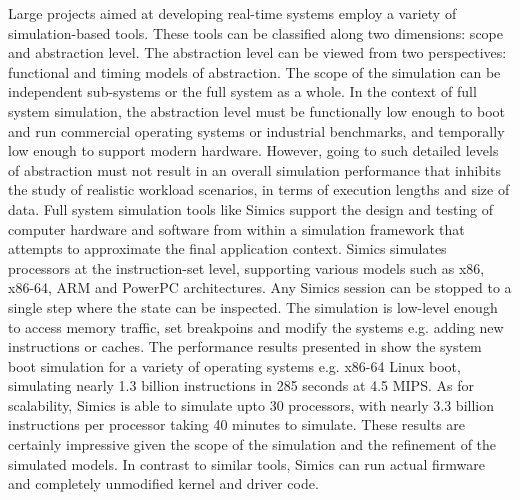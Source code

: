 Large projects aimed at developing real-time systems employ a variety of
simulation-based tools. These tools can be classified along two dimensions:
scope and abstraction level. The abstraction level can be viewed from two
perspectives: functional and timing models of abstraction. The scope of the
simulation can be independent sub-systems or the full system as a whole. In the
context of full system simulation, the abstraction level must be functionally
low enough to boot and run commercial operating systems or industrial
benchmarks, and temporally low enough to support modern hardware. However, going
to such detailed levels of abstraction must not result in an overall simulation
performance that inhibits the study of realistic workload scenarios, in terms of
execution lengths and size of data. Full system simulation tools like Simics
\cite{magnusson2002simics} support the design and testing of computer hardware
and software from within a simulation framework that attempts to approximate the
final application context. Simics simulates processors at the instruction-set
level, supporting various models such as x86, x86-64, ARM and PowerPC
architectures. Any Simics session can be stopped to a single step where the
state can be inspected. The simulation is low-level enough to access memory
traffic, set breakpoins and modify the systems e.g. adding new instructions or
caches. The performance results presented in \cite{magnusson2002simics} show the
system boot simulation for a variety of operating systems e.g. x86-64 Linux
boot, simulating nearly 1.3 billion instructions in 285 seconds at 4.5 MIPS. As
for scalability, Simics is able to simulate upto 30 processors, with nearly 3.3
billion instructions per processor taking 40 minutes to simulate. These results
are certainly impressive given the scope of the simulation and the refinement of
the simulated models. In contrast to similar tools, Simics can run actual
firmware and completely unmodified kernel and driver code.

